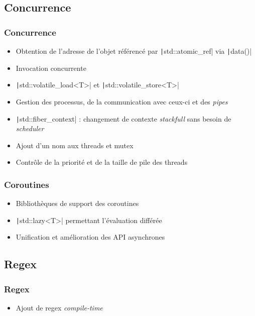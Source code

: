 \documentclass[C++.tex]{subfiles}
\begin{document}
\subsection*{Concurrence}
\begin{frame}[fragile]
	\frametitle{Concurrence}
	\begin{itemize}
		\item Obtention de l'adresse de l'objet référencé par \texttt|std::atomic_ref| via \texttt|data()|
		\item Invocation concurrente
		\item \texttt|std::volatile_load<T>| et \texttt|std::volatile_store<T>|
		\item Gestion des processus, de la communication avec ceux-ci et des \textit{pipes}
		\item \texttt|std::fiber_context| : changement de contexte \textit{stackfull} sans besoin de \textit{scheduler}
		\item Ajout d'un nom aux threads et mutex
		\item Contrôle de la priorité et de la taille de pile des threads
	\end{itemize}

\end{frame}

\begin{frame}[fragile]
	\frametitle{Coroutines}
	\begin{itemize}
		\item Bibliothèques de support des coroutines
		\item \texttt|std::lazy<T>| permettant l'évaluation différée
		\item Unification et amélioration des API asynchrones
	\end{itemize}
\end{frame}

\subsection*{Regex}
\begin{frame}[fragile]
	\frametitle{Regex}
	\begin{itemize}
		\item Ajout de regex \textit{compile-time}
	\end{itemize}
\end{frame}
\end{document}
